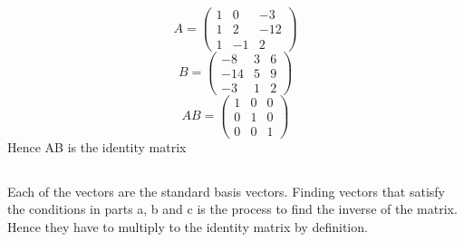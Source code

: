 \documentclass{article}
\begin{document}
\subsection{}
\[A = \begin{pmatrix}
    1&0&-3 \\ 1&2&-12 \\ 1&-1&2
\end{pmatrix}\]
\[B=\begin{pmatrix}
    -8&3&6 \\ -14&5&9 \\ -3&1&2
\end{pmatrix}\]
\[AB = \begin{pmatrix}
    1&0&0 \\ 0&1&0 \\ 0&0&1
\end{pmatrix}\]
Hence AB is the identity matrix
\subsection{}
Each of the vectors are the standard basis vectors. Finding vectors that satisfy the conditions in parts a, b and c is the process to find the inverse of the matrix. Hence they have to multiply to the identity matrix by definition. 
\end{document}
